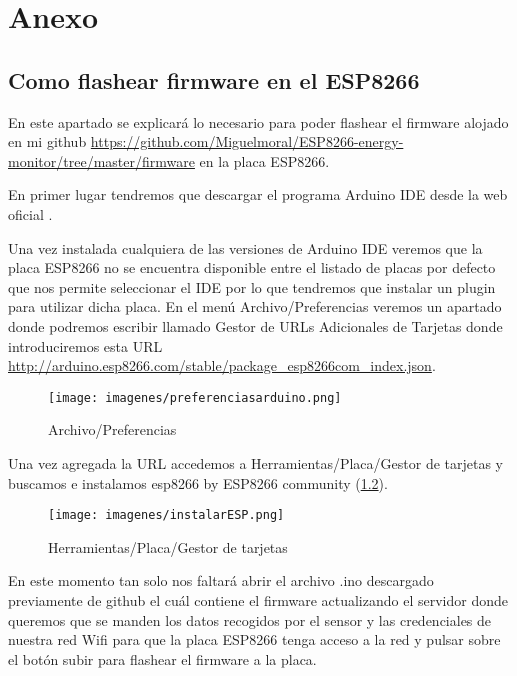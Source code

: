 	\chapter{Anexo}
	\section{Como flashear firmware en el ESP8266}
	
	En este apartado se explicará lo necesario para poder flashear el firmware alojado en mi github \url{https://github.com/Miguelmoral/ESP8266-energy-monitor/tree/master/firmware} en la placa ESP8266.
	
	En primer lugar tendremos que descargar el programa Arduino IDE desde la web oficial \cite{arduinoide}.
	
	Una vez instalada cualquiera de las versiones de Arduino IDE veremos que la placa ESP8266 no se encuentra disponible entre el listado de placas por defecto que nos permite seleccionar el IDE por lo que tendremos que instalar un plugin para utilizar dicha placa. En el menú Archivo/Preferencias veremos un apartado donde podremos escribir llamado Gestor de URLs Adicionales de Tarjetas donde introduciremos esta URL \url{http://arduino.esp8266.com/stable/package_esp8266com_index.json}.
	
	\begin{figure}[H]
		\centering
		\texttt{[image: imagenes/preferenciasarduino.png]}
		\caption{Archivo/Preferencias}
		\label{fig:preferenciasarduino}
	\end{figure}
	
	Una vez agregada la URL accedemos a Herramientas/Placa/Gestor de tarjetas y buscamos e instalamos esp8266 by ESP8266 community (\ref{fig:instalarESP8266}).
	
	\begin{figure}[H]
		\centering
		\texttt{[image: imagenes/instalarESP.png]}
		\caption{Herramientas/Placa/Gestor de tarjetas}
		\label{fig:instalarESP8266}
	\end{figure}
	
	En este momento tan solo nos faltará abrir el archivo .ino descargado previamente de github el cuál contiene el firmware actualizando el servidor donde queremos que se manden los datos recogidos por el sensor y las credenciales de nuestra red Wifi para que la placa ESP8266 tenga acceso a la red y pulsar sobre el botón subir para flashear el firmware a la placa.

